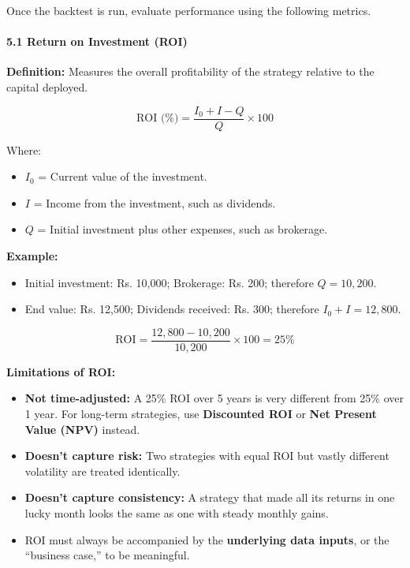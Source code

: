 \documentclass[12pt,openany]{book}
\begin{document}
Once the backtest is run, evaluate performance using the following metrics.

\paragraph{5.1 Return on Investment (ROI)}

\textbf{Definition:} Measures the overall profitability of the strategy relative to the capital deployed.

\begin{equation*}
    \text{ROI (\%)} = \frac{I_0 + I - Q}{Q} \times 100
\end{equation*}

Where:
\begin{itemize}[leftmargin=*]
    \item $I_0$ = Current value of the investment.
    \item $I$ = Income from the investment, such as dividends.
    \item $Q$ = Initial investment plus other expenses, such as brokerage.
\end{itemize}

\textbf{Example:}
\begin{itemize}[leftmargin=*]
    \item Initial investment: Rs. 10,000; Brokerage: Rs. 200; therefore $Q = 10{,}200$.
    \item End value: Rs. 12,500; Dividends received: Rs. 300; therefore $I_0 + I = 12{,}800$.
\end{itemize}

\begin{equation*}
    \text{ROI} = \frac{12{,}800 - 10{,}200}{10{,}200} \times 100 = 25\%
\end{equation*}

\textbf{Limitations of ROI:}
\begin{itemize}[leftmargin=*]
    \item \textbf{Not time-adjusted:} A 25\% ROI over 5 years is very different from 25\% over 1 year. For long-term strategies, use \textbf{Discounted ROI} or \textbf{Net Present Value (NPV)} instead.
    \item \textbf{Doesn't capture risk:} Two strategies with equal ROI but vastly different volatility are treated identically.
    \item \textbf{Doesn't capture consistency:} A strategy that made all its returns in one lucky month looks the same as one with steady monthly gains.
    \item ROI must always be accompanied by the \textbf{underlying data inputs}, or the ``business case,'' to be meaningful.
\end{itemize}
\end{document}
